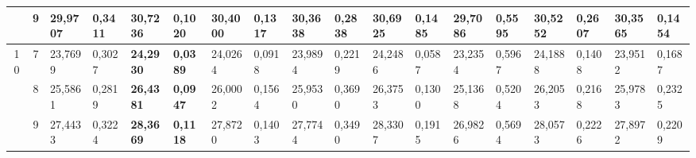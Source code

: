 \documentclass[conference]{IEEEtran}
\begin{document}
\begin{table*}[]
\begin{tabular}{|cc|ll|ll|ll|ll|ll|ll|ll|ll|}
		\multicolumn{1}{|c|}{}                    & 9          & \multicolumn{1}{l|}{29,9707}           & 0,3411                            & \multicolumn{1}{l|}{\textbf{30,7236}}  & \textbf{0,1020}                   & \multicolumn{1}{l|}{30,4000}           & 0,1317                            & \multicolumn{1}{l|}{30,3638}           & 0,2838                            & \multicolumn{1}{l|}{30,6925}           & 0,1485                            & \multicolumn{1}{l|}{29,7086}           & 0,5595                            & \multicolumn{1}{l|}{30,5252}           & 0,2607                            & \multicolumn{1}{l|}{30,3565}           & 0,1454                            \\ \hline
		\multicolumn{1}{|c|}{\multirow{3}{*}{10}} & 7          & \multicolumn{1}{l|}{23,7699}           & 0,3027                            & \multicolumn{1}{l|}{\textbf{24,2930}}  & \textbf{0,0389}                   & \multicolumn{1}{l|}{24,0264}           & 0,0918                            & \multicolumn{1}{l|}{23,9894}           & 0,2219                            & \multicolumn{1}{l|}{24,2486}           & 0,0587                            & \multicolumn{1}{l|}{23,2354}           & 0,5967                            & \multicolumn{1}{l|}{24,1888}           & 0,1408                            & \multicolumn{1}{l|}{23,9512}           & 0,1687                            \\ \cline{2-18} 
		\multicolumn{1}{|c|}{}                    & 8          & \multicolumn{1}{l|}{25,5861}           & 0,2819                            & \multicolumn{1}{l|}{\textbf{26,4381}}  & \textbf{0,0947}                   & \multicolumn{1}{l|}{26,0002}           & 0,1564                            & \multicolumn{1}{l|}{25,9530}           & 0,3690                            & \multicolumn{1}{l|}{26,3753}           & 0,1300                            & \multicolumn{1}{l|}{25,1368}           & 0,5204                            & \multicolumn{1}{l|}{26,2053}           & 0,2168                            & \multicolumn{1}{l|}{25,9783}           & 0,2325                            \\ \cline{2-18} 
		\multicolumn{1}{|c|}{}                    & 9          & \multicolumn{1}{l|}{27,4433}           & 0,3224                            & \multicolumn{1}{l|}{\textbf{28,3669}}  & \textbf{0,1118}                   & \multicolumn{1}{l|}{27,8720}           & 0,1403                            & \multicolumn{1}{l|}{27,7744}           & 0,3490                            & \multicolumn{1}{l|}{28,3307}           & 0,1915                            & \multicolumn{1}{l|}{26,9826}           & 0,5694                            & \multicolumn{1}{l|}{28,0573}           & 0,2226                            & \multicolumn{1}{l|}{27,8972}           & 0,2209                            \\ \hline

\end{tabular}
\end{table*}
\end{document}
